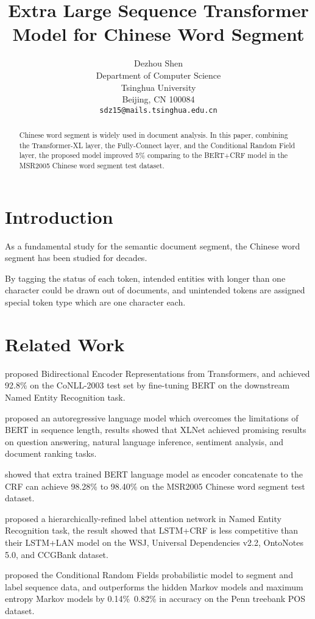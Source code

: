 \documentclass[11pt,a4paper]{article}
\title{Extra Large Sequence Transformer Model for Chinese Word Segment}
\author{Dezhou Shen \\
  Department of Computer Science\\
  Tsinghua University\\
  Beijing, CN 100084\\
  \texttt{sdz15@mails.tsinghua.edu.cn} \\}
\date{}
\begin{document}
\maketitle
\begin{abstract}
 Chinese word segment is widely used in document analysis.
 In this paper, combining the Transformer-XL layer, the Fully-Connect layer, and the Conditional Random Field layer,
 the proposed model improved 5\% comparing to the BERT+CRF model in the MSR2005 Chinese word segment test dataset.
\end{abstract}

\section{Introduction}

 As a fundamental study for the semantic document segment, the Chinese word segment has been studied for decades.

 By tagging the status of each token, intended entities with longer than one character could be drawn out of documents,
 and unintended tokens are assigned special token type which are one character each.

\section{Related Work}

  \citet{devlin2019bert} proposed Bidirectional Encoder Representations from Transformers, and achieved 92.8\% on the CoNLL-2003 test set by
fine-tuning BERT on the downstream Named Entity Recognition task.

  \citet{yang2019xlnet} proposed an autoregressive language model which overcomes the limitations of BERT in sequence length,
results showed that XLNet achieved promising results on question answering, natural language inference, sentiment analysis, and document ranking tasks.

  \citet{tian2020improving} showed that extra trained BERT language model as encoder concatenate to the CRF can achieve 98.28\% to 98.40\% on the MSR2005 Chinese word segment test dataset.

  \citet{cui2019hierarchically} proposed a hierarchically-refined label attention network in Named Entity Recognition task, the result showed that LSTM+CRF is less competitive than their LSTM+LAN model on the WSJ,
Universal Dependencies v2.2, OntoNotes 5.0, and CCGBank dataset.

  \citet{Lafferty2001Conditional} proposed the Conditional Random Fields probabilistic model to segment and label sequence data, and outperforms the hidden Markov models and maximum entropy Markov models by 0.14\%~0.82\% in accuracy on the Penn treebank POS dataset.
\end{document}
